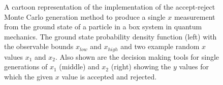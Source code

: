\documentclass[UKenglish,texlive=2016]{\ATLASLATEXPATH atlasdoc}
\begin{document}
\begin{figure}
 \centering
{}
 \caption{A cartoon representation of the implementation of the accept-reject Monte Carlo generation method to produce a single $x$ measurement from the ground state of a particle in a box system in quantum mechanics.  The ground state probability density function (left) with the observable bounds $x_{low}$ and $x_{high}$ and two example random $x$ values $x_1$ and $x_2$.  Also shown are the decision making tools for single generations of $x_1$ (middle) and $x_2$ (right) showing the $y$ values for which the given $x$ value is accepted and rejected.}
 \label{fig:particle_in_box_acceptreject}
\end{figure}
\end{document}
